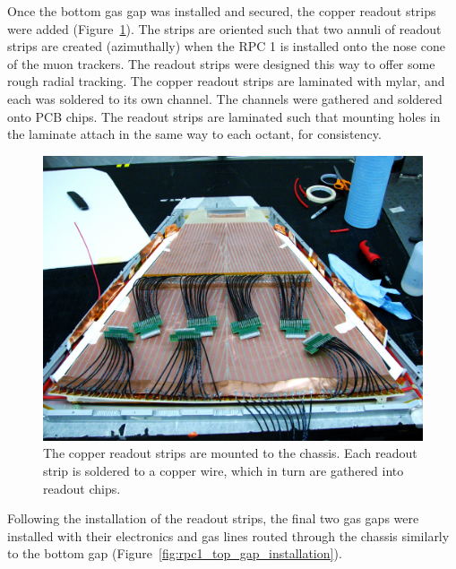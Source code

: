 Once the bottom gas gap was installed and secured, the copper readout strips
were added (Figure~\ref{fig:rpc1_construction_5}). The strips are oriented such
that two annuli of readout strips are created (azimuthally) when the RPC 1 is
installed onto the nose cone of the muon trackers. The readout strips were
designed this way to offer some rough radial tracking. The copper readout strips
are laminated with mylar, and each was soldered to its own channel. The channels
were gathered and soldered onto PCB chips. The readout strips are laminated such
that mounting holes in the laminate attach in the same way to each octant, for
consistency.

\begin{figure}
  \centering
  \includegraphics[width=0.7\linewidth]{./figures/rpc1_construction_5}
  \caption{
    The copper readout strips are mounted to the chassis. Each readout strip is
    soldered to a copper wire, which in turn are gathered into readout chips.
  }
  \label{fig:rpc1_construction_5}
\end{figure}

Following the installation of the readout strips, the final two gas gaps were
installed with their electronics and gas lines routed through the chassis
similarly to the bottom gap (Figure~\ref{fig:rpc1_top_gap_installation}).

